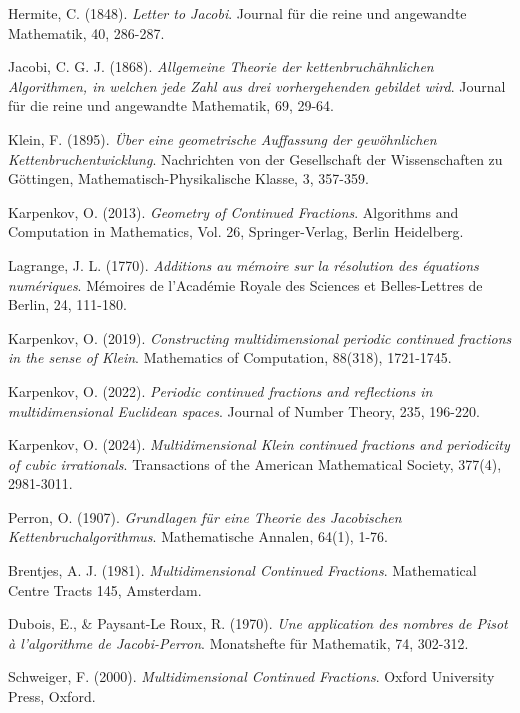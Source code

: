 \begin{thebibliography}{99}

Hermite, C. (1848).
\textit{Letter to Jacobi}.
Journal für die reine und angewandte Mathematik, 40, 286-287.

Jacobi, C. G. J. (1868).
\textit{Allgemeine Theorie der kettenbruchähnlichen Algorithmen, in welchen jede Zahl aus drei vorhergehenden gebildet wird}.
Journal für die reine und angewandte Mathematik, 69, 29-64.

Klein, F. (1895).
\textit{Über eine geometrische Auffassung der gewöhnlichen Kettenbruchentwicklung}.
Nachrichten von der Gesellschaft der Wissenschaften zu Göttingen, Mathematisch-Physikalische Klasse, 3, 357-359.

Karpenkov, O. (2013). 
\textit{Geometry of Continued Fractions}. 
Algorithms and Computation in Mathematics, Vol. 26, Springer-Verlag, Berlin Heidelberg.

Lagrange, J. L. (1770).
\textit{Additions au mémoire sur la résolution des équations numériques}.
Mémoires de l'Académie Royale des Sciences et Belles-Lettres de Berlin, 24, 111-180.

Karpenkov, O. (2019).
\textit{Constructing multidimensional periodic continued fractions in the sense of Klein}.
Mathematics of Computation, 88(318), 1721-1745.

Karpenkov, O. (2022).
\textit{Periodic continued fractions and reflections in multidimensional Euclidean spaces}.
Journal of Number Theory, 235, 196-220.

Karpenkov, O. (2024).
\textit{Multidimensional Klein continued fractions and periodicity of cubic irrationals}.
Transactions of the American Mathematical Society, 377(4), 2981-3011.

Perron, O. (1907).
\textit{Grundlagen für eine Theorie des Jacobischen Kettenbruchalgorithmus}.
Mathematische Annalen, 64(1), 1-76.

Brentjes, A. J. (1981).
\textit{Multidimensional Continued Fractions}.
Mathematical Centre Tracts 145, Amsterdam.

Dubois, E., & Paysant-Le Roux, R. (1970).
\textit{Une application des nombres de Pisot à l'algorithme de Jacobi-Perron}.
Monatshefte für Mathematik, 74, 302-312.

Schweiger, F. (2000).
\textit{Multidimensional Continued Fractions}.
Oxford University Press, Oxford.


\end{thebibliography}
